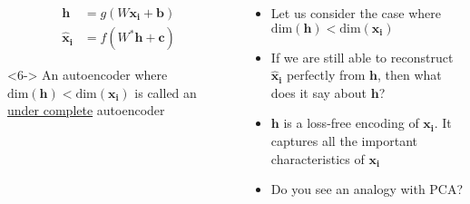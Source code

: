 \begin{frame}
	\begin{columns}
            \begin{overlayarea}{\textwidth}{\textheight}  
    		    \vspace{5.27pt}
			            
                \vspace{-10.5pt}
    		    \begin{align*}
        		        \mathbf{h} &= g(W\mathbf{x_i} +\mathbf{b})\\
            		   \mathbf{\hat{x}_i} &= f(W^*\mathbf{h} +\mathbf{c})
        		\end{align*}                

        
        		\begin{block}<6->{}
            		\justifying
            		\fontsize{10pt}{7.2}\selectfont
            		An autoencoder where $\text{dim}(\mathbf{h})<\text{dim}(\mathbf{x_i})$ is called an \underline{under complete} autoencoder
        		\end{block}
    		\end{overlayarea}

    		\begin{overlayarea}{\textwidth}{\textheight}
    			\only<2->
    			{
	        		\begin{itemize}\justifying
        		    	\item<2-> Let us consider the case where $\text{dim}(\mathbf{h})<\text{dim}(\mathbf{x_i})$
            			\item<3-> If we are still able to reconstruct $\mathbf{\hat{x}_i}$ perfectly from $\mathbf{h}$, then what does it say about $\mathbf{h}$?
            			\item<4-> $\mathbf{h}$ is a loss-free encoding of $\mathbf{x_i}$. It captures all the important characteristics of $\mathbf{x_i}$
            			\item<5-> Do you see an analogy with PCA?
        			\end{itemize}
    			}
    		\end{overlayarea}  
  	\end{columns}
\end{frame}


